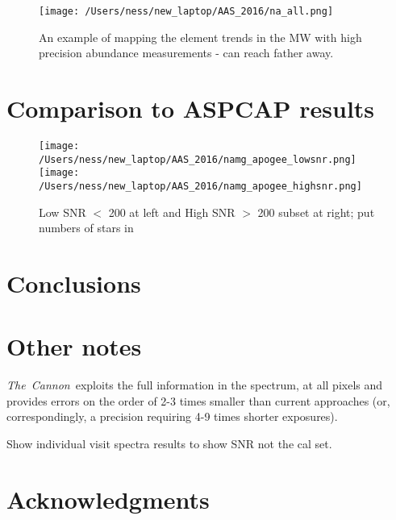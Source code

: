 \documentclass[12pt, preprint]{aastex}
\newcommand{\project}[1]{\textsl{#1}}
\newcommand{\tc}{\project{The~Cannon}}
\newcommand{\apogee}{\project{\textsc{apogee}}}
\newcommand{\aspcap}{\project{\textsc{aspcap}}}
\newcommand{\teff}{\mbox{$\rm T_{eff}$}}
\newcommand{\feh}{\mbox{$\rm [Fe/H]$}}
\newcommand{\alphafe}{\mbox{$\rm [\alpha/Fe]$}}
\newcommand{\logg}{\mbox{$\rm \log g$}}
\begin{document}
\begin{figure}
\center
  \texttt{[image: /Users/ness/new\_laptop/AAS\_2016/na\_all.png]}
    \caption{An example of mapping the element trends in the MW with high precision abundance measurements - can reach father away.}
\label{fig:cn}
\end{figure}

\section{Comparison to ASPCAP results} 

\begin{figure}
\flushleft
  \texttt{[image: /Users/ness/new\_laptop/AAS\_2016/namg\_apogee\_lowsnr.png]}
  \texttt{[image: /Users/ness/new\_laptop/AAS\_2016/namg\_apogee\_highsnr.png]}
    \caption{Low SNR $<$ 200 at left and High SNR $>$ 200 subset at right; put numbers of stars in}
\label{fig:cn}
\end{figure}

%

\section{Conclusions}



\section{Other notes} 

\tc\ exploits the full information in the spectrum, at all pixels and provides errors on the order of 2-3 times smaller than current approaches (or, correspondingly, a precision requiring 4-9 times shorter exposures). %

Show individual visit spectra results to show SNR not the cal set. \\




\section*{Acknowledgments}
\end{document}
